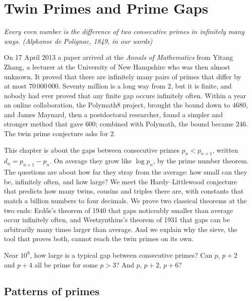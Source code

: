 \chapter{Twin Primes and Prime Gaps}\label{ch:twins}

\begin{center}\itshape
Every even number is the difference of two consecutive primes in infinitely many ways.
\upshape(Alphonse de Polignac, 1849, in our words)
\end{center}

On 17 April 2013 a paper arrived at the \emph{Annals of Mathematics} from Yitang Zhang, a lecturer at the University of New Hampshire who was then
almost unknown. It proved that there are infinitely many pairs of primes that differ by at most $70\,000\,000$. Seventy million is a long way from $2$,
but it is finite, and nobody had ever proved that any finite gap occurs infinitely often. Within a year an online collaboration, the Polymath8 project,
brought the bound down to $4680$, and James Maynard, then a postdoctoral researcher, found a simpler and stronger method that gave $600$; combined with
Polymath, the bound became $246$. The twin prime conjecture asks for $2$.

This chapter is about the gaps between consecutive primes $p_n<p_{n+1}$, written $d_n=p_{n+1}-p_n$. On average they grow like $\log p_n$, by the prime
number theorem. The questions are about how far they stray from the average: how small can they be, infinitely often, and how large? We meet the
Hardy--Littlewood conjecture that predicts how many twins, cousins and triples there are, with constants that match a billion numbers to four
decimals. We prove two classical theorems at the two ends: Erd\H{o}s's theorem of 1940 that gaps noticeably smaller than average occur infinitely often,
and Westzynthius's theorem of 1931 that gaps can be arbitrarily many times larger than average. And we explain why the sieve, the tool that proves
both, cannot reach the twin primes on its own.

\begin{think}
Near $10^9$, how large is a typical gap between consecutive primes? Can $p$, $p+2$ and $p+4$ all be prime for some $p>3$? And $p$, $p+2$, $p+6$?
\end{think}

\section{Patterns of primes}

